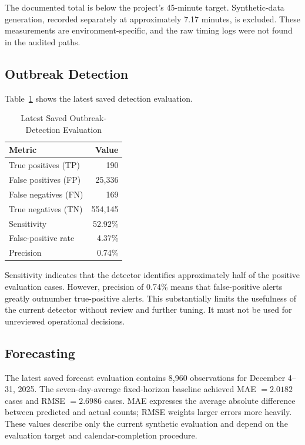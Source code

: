 \documentclass[conference]{IEEEtran}
\begin{document}
The documented total is below the project's 45-minute target. Synthetic-data generation, recorded separately at approximately 7.17 minutes, is excluded. These measurements are environment-specific, and the raw timing logs were not found in the audited paths.

\subsection{Outbreak Detection}

Table~\ref{tab:detection} shows the latest saved detection evaluation.

\begin{table}[htbp]
\caption{Latest Saved Outbreak-Detection Evaluation}
\label{tab:detection}
\centering
\begin{tabular}{lr}
\toprule
Metric & Value \\
\midrule
True positives (TP) & 190 \\
False positives (FP) & 25,336 \\
False negatives (FN) & 169 \\
True negatives (TN) & 554,145 \\
Sensitivity & 52.92\% \\
False-positive rate & 4.37\% \\
Precision & 0.74\% \\
\bottomrule
\end{tabular}
\end{table}

Sensitivity indicates that the detector identifies approximately half of the positive evaluation cases. However, precision of 0.74\% means that false-positive alerts greatly outnumber true-positive alerts. This substantially limits the usefulness of the current detector without review and further tuning. It must not be used for unreviewed operational decisions.

\subsection{Forecasting}

The latest saved forecast evaluation contains 8,960 observations for December 4--31, 2025. The seven-day-average fixed-horizon baseline achieved MAE \(=2.0182\) cases and RMSE \(=2.6986\) cases. MAE expresses the average absolute difference between predicted and actual counts; RMSE weights larger errors more heavily. These values describe only the current synthetic evaluation and depend on the evaluation target and calendar-completion procedure.
\end{document}
